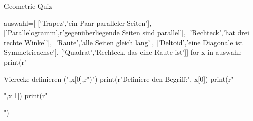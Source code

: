 \documentclass[ngerman,a4paper,10pt]{article}
\begin{document}
\begin{quiz}{Geometrie-Quiz}
\begin{python}
auswahl=[
  ['Trapez','ein Paar paralleler Seiten'],
  ['Parallelogramm',r'gegen\"uberliegende Seiten sind parallel'],
  ['Rechteck','hat drei rechte Winkel'],
  ['Raute','alle Seiten gleich lang'],
  ['Deltoid','eine Diagonale ist Symmetrieachse'],
  ['Quadrat','Rechteck, das eine Raute ist']]
for x in auswahl:
  print(r"\begin{essay}[points=2, response format=html]{Vierecke definieren (",x[0],r")}")
  print(r"Definiere den Begriff:", x[0])
  print(r" \item",x[1])
  print(r"\end{essay}")
\end{python}	
\end{quiz}
\end{document}
